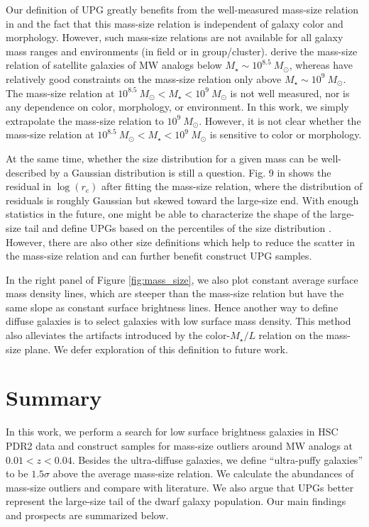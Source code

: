 \documentclass[twocolumn,astrosymb,twocolappendix]{aastex631}
\begin{document}
\begin{CJK*}{UTF8}{gbsn}
Our definition of UPG greatly benefits from the well-measured mass-size relation in \citet{ELVES-I} and the fact that this mass-size relation is independent of galaxy color and morphology. However, such mass-size relations are not available for all galaxy mass ranges and environments (in field or in group/cluster). \citet{ELVES-I} derive the mass-size relation of satellite galaxies of MW analogs below $M_\star \sim 10^{8.5}\ M_\odot$, whereas \citet{Lange2015} have relatively good constraints on the mass-size relation only above $M_\star \sim 10^{9}\ M_\odot$. The mass-size relation at $10^{8.5}\ M_\odot < M_\star < 10^{9}\ M_\odot$ is not well measured, nor is any dependence on color, morphology, or environment. In this work, we simply extrapolate the \citet{ELVES-I} mass-size relation to $10^9\ M_\odot$. However, it is not clear whether the mass-size relation at $10^{8.5}\ M_\odot < M_\star < 10^{9}\ M_\odot$ is sensitive to color or morphology. 

At the same time, whether the size distribution for a given mass can be well-described by a Gaussian distribution is still a question. Fig. 9 in \citet{ELVES-I} shows the residual in $\log(r_e)$ after fitting the mass-size relation, where the distribution of residuals is roughly Gaussian but skewed toward the large-size end. With enough statistics in the future, one might be able to characterize the shape of the large-size tail and define UPGs based on the percentiles of the size distribution \citep{Greene2022}. However, there are also other size definitions which help to reduce the scatter in the mass-size relation \citep[e.g.,][]{Miller2019,Mowla2019,Trujillo2020,Chamba2022} and can further benefit construct UPG samples. 

In the right panel of Figure \ref{fig:mass_size}, we also plot constant average surface mass density lines, which are steeper than the mass-size relation but have the same slope as constant surface brightness lines. Hence another way to define diffuse galaxies is to select galaxies with low surface mass density. This method also alleviates the artifacts introduced by the color-$M_\star/L$ relation on the mass-size plane. We defer exploration of this definition to future work.  


\section{Summary}\label{sec:summary}
In this work, we perform a search for low surface brightness galaxies in HSC PDR2 data and construct samples for mass-size outliers around MW analogs at $0.01 < z < 0.04$. Besides the ultra-diffuse galaxies, we define ``ultra-puffy galaxies'' to be $1.5\sigma$ above the average mass-size relation. We calculate the abundances of mass-size outliers and compare with literature. We also argue that UPGs better represent the large-size tail of the dwarf galaxy population. Our main findings and prospects are summarized below. 


\end{CJK*}
\end{document}
